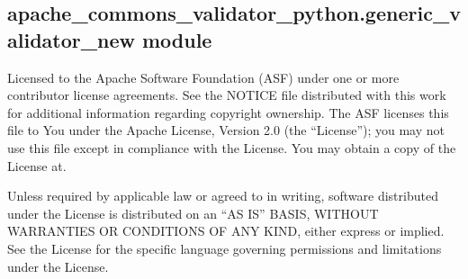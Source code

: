 \documentclass[letterpaper,10pt,english]{sphinxmanual}
\begin{document}
\begin{fulllineitems}
\begin{fulllineitems}
\end{fulllineitems}


\begin{fulllineitems}
\label{\detokenize{apache_commons_validator_python:apache_commons_validator_python.generic_type_validator_new.GenericTypeValidator.serializable}}
\pysigstartsignatures
{}
\pysigstopsignatures
\end{fulllineitems}


\end{fulllineitems}



\subsection{apache\_commons\_validator\_python.generic\_validator\_new module}
\label{\detokenize{apache_commons_validator_python:module-apache_commons_validator_python.generic_validator_new}}\label{\detokenize{apache_commons_validator_python:apache-commons-validator-python-generic-validator-new-module}}
\sphinxAtStartPar
Licensed to the Apache Software Foundation (ASF) under one or more contributor
license agreements.  See the NOTICE file distributed with this work for additional
information regarding copyright ownership. The ASF licenses this file to You under the
Apache License, Version 2.0 (the “License”); you may not use this file except in
compliance with the License.  You may obtain a copy of the License at.

\sphinxAtStartPar
{}

\sphinxAtStartPar
Unless required by applicable law or agreed to in writing, software
distributed under the License is distributed on an “AS IS” BASIS,
WITHOUT WARRANTIES OR CONDITIONS OF ANY KIND, either express or implied.
See the License for the specific language governing permissions and
limitations under the License.
\end{document}
